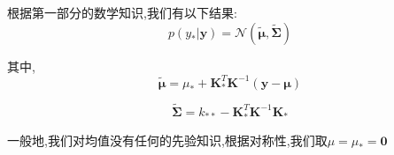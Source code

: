 \documentclass[UTF8,a4paper]{ctexart}
\begin{document}
            根据第一部分的数学知识,我们有以下结果:
            \begin{equation}
                p(y_* | \bm y)  = \mathcal{N}( \bm \tilde \mu ,  \bm  \tilde \Sigma)
            \end{equation}

            其中,
            \begin{equation}
                \bm \tilde \mu = \mu_* + \bm K_*^T\bm K^{-1}(\bm y - \bm \mu)
            \end{equation}

            \begin{equation}
                 \bm \tilde \Sigma = k_{**} - \bm K_*^T\bm K^{-1}\bm K_*
            \end{equation}

            {\color{blue}一般地,我们对均值没有任何的先验知识,根据对称性,我们取$\mu = \mu_* = \bm 0$}
\end{document}
